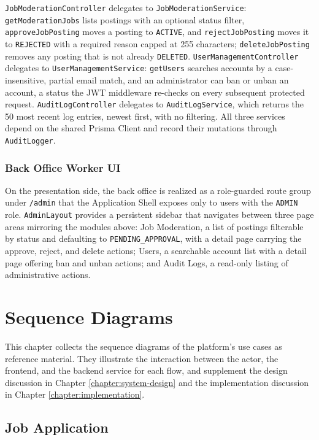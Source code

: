\texttt{JobModerationController} delegates to \texttt{JobModerationService}: \texttt{getModerationJobs} lists postings with an optional status filter, \texttt{approveJobPosting} moves a posting to \texttt{ACTIVE}, and \texttt{rejectJobPosting} moves it to \texttt{REJECTED} with a required reason capped at 255 characters; \texttt{deleteJobPosting} removes any posting that is not already \texttt{DELETED}. \texttt{UserManagementController} delegates to \texttt{UserManagementService}: \texttt{getUsers} searches accounts by a case-insensitive, partial email match, and an administrator can ban or unban an account, a status the JWT middleware re-checks on every subsequent protected request. \texttt{AuditLogController} delegates to \texttt{AuditLogService}, which returns the 50 most recent log entries, newest first, with no filtering. All three services depend on the shared Prisma Client and record their mutations through \texttt{AuditLogger}.

\subsection{Back Office Worker UI}

On the presentation side, the back office is realized as a role-guarded route group under \texttt{/admin} that the Application Shell exposes only to users with the \texttt{ADMIN} role. \texttt{AdminLayout} provides a persistent sidebar that navigates between three page areas mirroring the modules above: Job Moderation, a list of postings filterable by status and defaulting to \texttt{PENDING\_APPROVAL}, with a detail page carrying the approve, reject, and delete actions; Users, a searchable account list with a detail page offering ban and unban actions; and Audit Logs, a read-only listing of administrative actions.

\chapter{Sequence Diagrams}
\label{appendix:sequence-diagrams}

This chapter collects the sequence diagrams of the platform's use cases as reference material. They illustrate the interaction between the actor, the frontend, and the backend service for each flow, and supplement the design discussion in Chapter \ref{chapter:system-design} and the implementation discussion in Chapter \ref{chapter:implementation}.

\section{Job Application}

